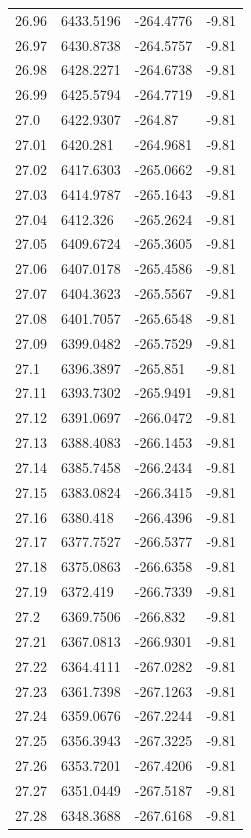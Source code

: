 \begin{table}[H]
\begin{tabular}{llll}
26.96 & 6433.5196 & -264.4776 & -9.81 \\
26.97 & 6430.8738 & -264.5757 & -9.81 \\
26.98 & 6428.2271 & -264.6738 & -9.81 \\
26.99 & 6425.5794 & -264.7719 & -9.81 \\
27.0 & 6422.9307 & -264.87 & -9.81 \\
27.01 & 6420.281 & -264.9681 & -9.81 \\
27.02 & 6417.6303 & -265.0662 & -9.81 \\
27.03 & 6414.9787 & -265.1643 & -9.81 \\
27.04 & 6412.326 & -265.2624 & -9.81 \\
27.05 & 6409.6724 & -265.3605 & -9.81 \\
27.06 & 6407.0178 & -265.4586 & -9.81 \\
27.07 & 6404.3623 & -265.5567 & -9.81 \\
27.08 & 6401.7057 & -265.6548 & -9.81 \\
27.09 & 6399.0482 & -265.7529 & -9.81 \\
27.1 & 6396.3897 & -265.851 & -9.81 \\
27.11 & 6393.7302 & -265.9491 & -9.81 \\
27.12 & 6391.0697 & -266.0472 & -9.81 \\
27.13 & 6388.4083 & -266.1453 & -9.81 \\
27.14 & 6385.7458 & -266.2434 & -9.81 \\
27.15 & 6383.0824 & -266.3415 & -9.81 \\
27.16 & 6380.418 & -266.4396 & -9.81 \\
27.17 & 6377.7527 & -266.5377 & -9.81 \\
27.18 & 6375.0863 & -266.6358 & -9.81 \\
27.19 & 6372.419 & -266.7339 & -9.81 \\
27.2 & 6369.7506 & -266.832 & -9.81 \\
27.21 & 6367.0813 & -266.9301 & -9.81 \\
27.22 & 6364.4111 & -267.0282 & -9.81 \\
27.23 & 6361.7398 & -267.1263 & -9.81 \\
27.24 & 6359.0676 & -267.2244 & -9.81 \\
27.25 & 6356.3943 & -267.3225 & -9.81 \\
27.26 & 6353.7201 & -267.4206 & -9.81 \\
27.27 & 6351.0449 & -267.5187 & -9.81 \\
27.28 & 6348.3688 & -267.6168 & -9.81 \\

\end{tabular}
\end{table}

